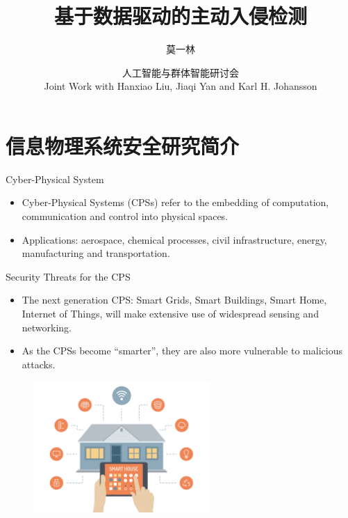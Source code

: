 \documentclass[10pt]{beamer}
\title[Secure CPS]{基于数据驱动的主动入侵检测}
\author[Yilin Mo]{莫一林}
\institute[Tsinghua]{
  清华大学 自动化系
}
\date[Nov 25, 2018]{ 人工智能与群体智能研讨会\\ 
  \small Joint Work with Hanxiao Liu, Jiaqi Yan and Karl H. Johansson}
\begin{document}
\maketitle 

\section{信息物理系统安全研究简介}

\begin{frame}{Cyber-Physical System}
  \begin{itemize}
  \item Cyber-Physical Systems (CPSs) refer to the embedding of computation, communication and control into physical spaces.
    \begin{center}
    \end{center}
  \item Applications: aerospace, chemical processes, civil infrastructure, energy, manufacturing and transportation. 
  \end{itemize}
\end{frame}

\begin{frame}{Security Threats for the CPS}
  \begin{itemize}
  \item The next generation CPS: Smart Grids, Smart Buildings, Smart Home, Internet of Things, will make extensive use of widespread sensing and networking.
  \item As the CPSs become ``smarter'', they are also more vulnerable to malicious attacks.
  \end{itemize}
  \begin{figure}[ht]
    \centering
    \includegraphics[width=0.6\textwidth]{SmartHome.jpg}
  \end{figure}
\end{frame}
\end{document}
